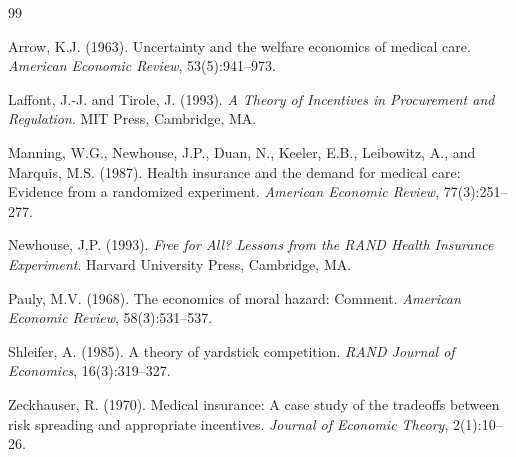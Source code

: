 \documentclass[12pt]{article}
\theoremstyle{plain}
\theoremstyle{definition}
\theoremstyle{remark}
\newcommand{\1}{\mathbf{1}}
\begin{document}
\begin{thebibliography}{99}

Arrow, K.J. (1963).
\newblock Uncertainty and the welfare economics of medical care.
\newblock \emph{American Economic Review}, 53(5):941--973.

Laffont, J.-J. and Tirole, J. (1993).
\newblock \emph{A Theory of Incentives in Procurement and Regulation}.
\newblock MIT Press, Cambridge, MA.

Manning, W.G., Newhouse, J.P., Duan, N., Keeler, E.B., Leibowitz, A., and Marquis, M.S. (1987).
\newblock Health insurance and the demand for medical care: Evidence from a randomized experiment.
\newblock \emph{American Economic Review}, 77(3):251--277.

Newhouse, J.P. (1993).
\newblock \emph{Free for All? Lessons from the RAND Health Insurance Experiment}.
\newblock Harvard University Press, Cambridge, MA.

Pauly, M.V. (1968).
\newblock The economics of moral hazard: Comment.
\newblock \emph{American Economic Review}, 58(3):531--537.

Shleifer, A. (1985).
\newblock A theory of yardstick competition.
\newblock \emph{RAND Journal of Economics}, 16(3):319--327.

Zeckhauser, R. (1970).
\newblock Medical insurance: A case study of the tradeoffs between risk spreading and appropriate incentives.
\newblock \emph{Journal of Economic Theory}, 2(1):10--26.

\end{thebibliography}
\end{document}
